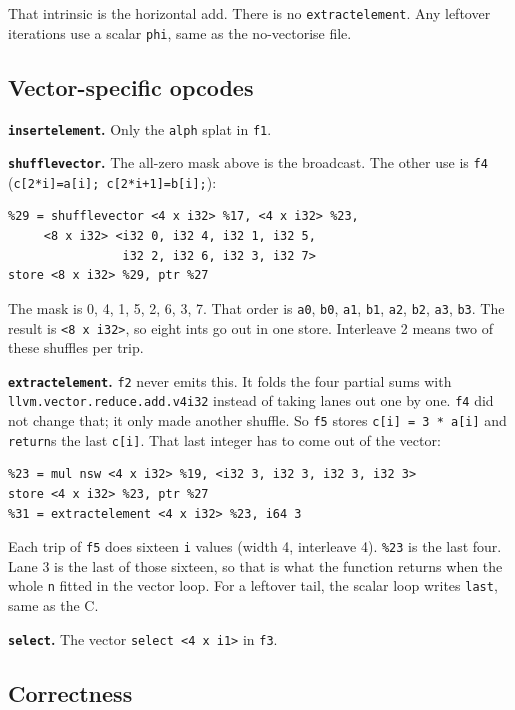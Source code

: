 \documentclass[11pt,a4paper]{article}
\begin{document}
That intrinsic is the horizontal add. There is no
\texttt{extractelement}. Any leftover iterations use a scalar
\texttt{phi}, same as the no-vectorise file.

\subsection*{Vector-specific opcodes}

\textbf{\texttt{insertelement}.} Only the \texttt{alph} splat in
\texttt{f1}.

\textbf{\texttt{shufflevector}.} The all-zero mask above is the
broadcast. The other use is \texttt{f4}
(\texttt{c[2*i]=a[i]; c[2*i+1]=b[i];}):

\begin{lstlisting}
%29 = shufflevector <4 x i32> %17, <4 x i32> %23,
     <8 x i32> <i32 0, i32 4, i32 1, i32 5,
                i32 2, i32 6, i32 3, i32 7>
store <8 x i32> %29, ptr %27
\end{lstlisting}

The mask is 0, 4, 1, 5, 2, 6, 3, 7. That order is
\texttt{a0}, \texttt{b0}, \texttt{a1}, \texttt{b1}, \texttt{a2},
\texttt{b2}, \texttt{a3}, \texttt{b3}. The
result is \texttt{<8 x i32>}, so eight ints go out in one store.
Interleave 2 means two of these shuffles per trip.

\textbf{\texttt{extractelement}.} \texttt{f2} never emits this. It
folds the four partial sums with
\texttt{llvm.vector.reduce.add.v4i32} instead of taking lanes out one
by one. \texttt{f4} did not change that; it only made another
shuffle. So \texttt{f5} stores \texttt{c[i] = 3 * a[i]} and
\texttt{return}s the last \texttt{c[i]}. That last integer has to
come out of the vector:

\begin{lstlisting}
%23 = mul nsw <4 x i32> %19, <i32 3, i32 3, i32 3, i32 3>
store <4 x i32> %23, ptr %27
%31 = extractelement <4 x i32> %23, i64 3
\end{lstlisting}

Each trip of \texttt{f5} does sixteen \texttt{i} values (width 4,
interleave 4). \texttt{\%23} is the last four. Lane 3 is the last of
those sixteen, so that is what the function returns when the whole
\texttt{n} fitted in the vector loop. For a leftover tail, the
scalar loop writes \texttt{last}, same as the C.

\textbf{\texttt{select}.} The vector \texttt{select <4 x i1>} in
\texttt{f3}.

\subsection*{Correctness}
\end{document}
